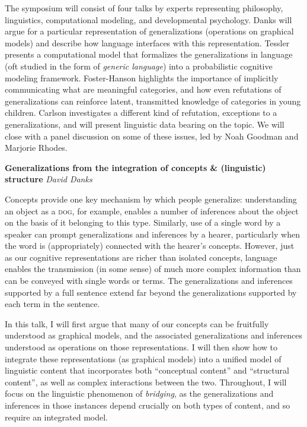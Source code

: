 \documentclass[10pt,letterpaper]{article}
\begin{document}
The symposium will consist of four talks by experts representing philosophy, linguistics, computational modeling, and developmental psychology.    
Danks will argue for a particular representation of generalizations (operations on graphical models) and describe how language interfaces with this representation.
 Tessler presents a computational model that formalizes the generalizations in language (oft studied in the form of \emph{generic language}) into a probabilistic cognitive modeling framework.
 Foster-Hanson highlights the importance of implicitly communicating what are meaningful categories, and how even refutations of generalizations can reinforce latent, transmitted knowledge of categories in young children.
 Carlson investigates a different kind of refutation, exceptions to a generalizations, and will present linguistic data bearing on the topic.
We will close with a panel discussion on some of these issues, led by Noah Goodman and Marjorie Rhodes.



\noindent\textbf{Generalizations from the integration of concepts \& (linguistic) structure} 
\noindent\emph{David Danks}

Concepts provide one key mechanism by which people generalize: understanding an object as a \textsc{dog}, for example, enables a number of inferences about the object on the basis of it belonging to this type. 
Similarly, use of a single word by a speaker can prompt generalizations and inferences by a hearer, particularly when the word is (appropriately) connected with the hearer's concepts. 
However, just as our cognitive representations are richer than isolated concepts, language enables the transmission (in some sense) of much more complex information than can be conveyed with single words or terms. 
The generalizations and inferences supported by a full sentence extend far beyond the generalizations supported by each term in the sentence. 

In this talk, I will first argue that many of our concepts can be fruitfully understood as graphical models, and the associated generalizations and inferences understood as operations on those representations. 
I will then show how to integrate these representations (as graphical models) into a unified model of linguistic content that incorporates both ``conceptual content'' and ``structural content'', as well as complex interactions between the two. 
Throughout, I will focus on the linguistic phenomenon of \emph{bridging}, as the generalizations and inferences in those instances depend crucially on both types of content, and so require an integrated model.
\end{document}
